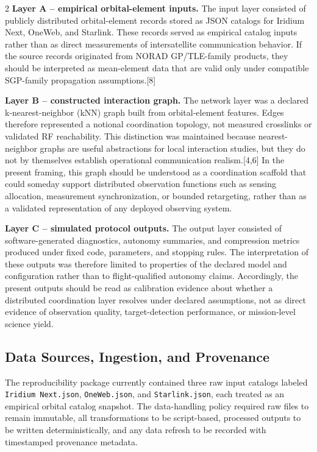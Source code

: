 \documentclass[fleqn,10pt,letterpaper]{article}
\begin{document}
\begin{multicols}{2}
\noindent\textbf{Layer A -- empirical orbital-element inputs.}
The input layer consisted of publicly distributed orbital-element records stored as JSON catalogs for Iridium Next, OneWeb, and Starlink. These records served as empirical catalog inputs rather than as direct measurements of intersatellite communication behavior. If the source records originated from NORAD GP/TLE-family products, they should be interpreted as mean-element data that are valid only under compatible SGP-family propagation assumptions.[8]

\noindent\textbf{Layer B -- constructed interaction graph.}
The network layer was a declared k-nearest-neighbor (kNN) graph built from orbital-element features. Edges therefore represented a notional coordination topology, not measured crosslinks or validated RF reachability. This distinction was maintained because nearest-neighbor graphs are useful abstractions for local interaction studies, but they do not by themselves establish operational communication realism.[4,6] In the present framing, this graph should be understood as a coordination scaffold that could someday support distributed observation functions such as sensing allocation, measurement synchronization, or bounded retargeting, rather than as a validated representation of any deployed observing system.

\noindent\textbf{Layer C -- simulated protocol outputs.}
The output layer consisted of software-generated diagnostics, autonomy summaries, and compression metrics produced under fixed code, parameters, and stopping rules. The interpretation of these outputs was therefore limited to properties of the declared model and configuration rather than to flight-qualified autonomy claims. Accordingly, the present outputs should be read as calibration evidence about whether a distributed coordination layer resolves under declared assumptions, not as direct evidence of observation quality, target-detection performance, or mission-level science yield.


\subsection{Data Sources, Ingestion, and Provenance}

The reproducibility package currently contained three raw input catalogs labeled \texttt{Iridium Next.json}, \texttt{OneWeb.json}, and \texttt{Starlink.json}, each treated as an empirical orbital catalog snapshot. The data-handling policy required raw files to remain immutable, all transformations to be script-based, processed outputs to be written deterministically, and any data refresh to be recorded with timestamped provenance metadata.


\end{multicols}
\end{document}
